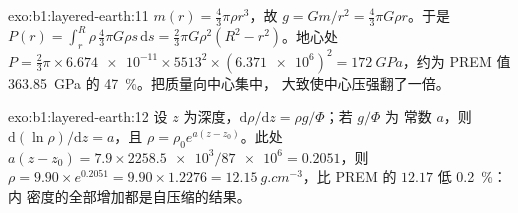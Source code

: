 \begin{solution}{exo:b1:layered-earth:11}
$m(r) = \tfrac43\pi\rho r^3$，故 $g = Gm/r^2 = \tfrac43\pi G\rho r$。于是
$P(r) = \int_r^R \rho\,\tfrac43\pi G\rho s\,\mathrm ds = \tfrac23\pi G\rho^2(R^2
- r^2)$。地心处 $P = \tfrac23\pi\times\num{6.674e-11}\times5513^2\times
(\num{6.371e6})^2 = \qty{172}{GPa}$，约为 PREM 值
\qty{363.85}{GPa} 的 \qty{47}{\percent}。把质量向中心集中，
大致使中心压强翻了一倍。
\end{solution}

\begin{solution}{exo:b1:layered-earth:12}
设 $z$ 为深度，$\mathrm d\rho/\mathrm dz = \rho g/\Phi$；若 $g/\Phi$ 为
常数 $a$，则 $\mathrm d(\ln\rho)/\mathrm dz = a$，且 $\rho = \rho_0
e^{a(z - z_0)}$。此处 $a(z - z_0) = 7.9\times\num{2258.5e3}/\num{87e6} =
0.2051$，则 $\rho = 9.90\times e^{0.2051} = 9.90\times1.2276 =
\qty{12.15}{g.cm^{-3}}$，比 PREM 的 $12.17$ 低 \qty{0.2}{\percent}：内
密度的全部增加都是自压缩的结果。
\end{solution}


